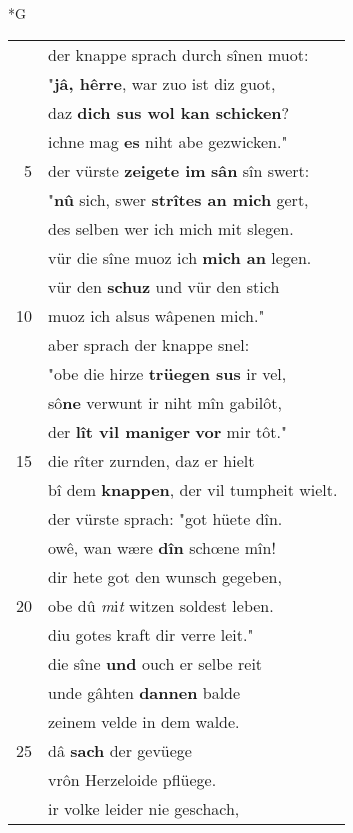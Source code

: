 \documentclass[8pt,a4paper,notitlepage]{article}
\begin{document}
\newpage
\begin{table}[ht]
\begin{minipage}[t]{0.5\linewidth}
\small
\begin{center}*G
\end{center}
\begin{tabular}{rl}
 & der knappe sprach durch sînen muot:\\ 
 & "\textbf{jâ, hêrre}, war zuo ist diz guot,\\ 
 & daz \textbf{dich sus wol kan schicken}?\\ 
 & ichne mag \textbf{es} niht abe gezwicken."\\ 
5 & der vürste \textbf{zeigete im} \textbf{sân} sîn swert:\\ 
 & "\textbf{nû} sich, swer \textbf{strîtes an mich} gert,\\ 
 & des selben wer ich mich mit slegen.\\ 
 & vür die sîne muoz ich \textbf{mich an} legen.\\ 
 & vür den \textbf{schuz} und vür den stich\\ 
10 & muoz ich alsus wâpenen mich."\\ 
 & aber sprach der knappe snel:\\ 
 & "obe die hirze \textbf{trüegen sus} ir vel,\\ 
 & sô\textbf{ne} verwunt ir niht mîn gabilôt,\\ 
 & der \textbf{lît vil maniger} \textbf{vor} mir tôt."\\ 
15 & die rîter zurnden, daz er hielt\\ 
 & bî dem \textbf{knappen}, der vil tumpheit wielt.\\ 
 & der vürste sprach: "got hüete dîn.\\ 
 & owê, wan wære \textbf{dîn} schœne mîn!\\ 
 & dir hete got den wunsch gegeben,\\ 
20 & obe dû \textit{m}i\textit{t} witzen soldest leben.\\ 
 & diu gotes kraft dir verre leit."\\ 
 & die sîne \textbf{und} ouch er selbe reit\\ 
 & unde gâhten \textbf{dannen} balde\\ 
 & zeinem velde in dem walde.\\ 
25 & dâ \textbf{sach} der gevüege\\ 
 & vrôn Herzeloide pflüege.\\ 
 & ir volke leider nie geschach,\\ 

\end{tabular}
\end{minipage}
\end{table}
\end{document}
